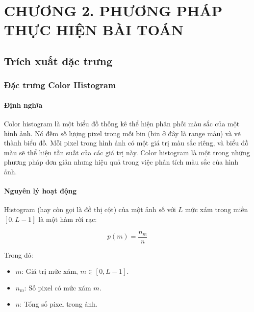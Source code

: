 \documentclass[a4paper,12pt]{article}
\begin{document}
\newpage
\section*{\centering CHƯƠNG 2. PHƯƠNG PHÁP THỰC HIỆN BÀI TOÁN}
\vspace{1cm}
\setcounter{section}{2}
\setcounter{subsection}{0}
\subsection{Trích xuất đặc trưng}

\subsubsection{Đặc trưng Color Histogram}

\paragraph{Định nghĩa}
\hspace{5mm}Color histogram là một biểu đồ thống kê thể hiện phân phối màu sắc của một hình ảnh. Nó đếm số lượng pixel trong mỗi bin (bin ở đây là range màu) và vẽ thành biểu đồ. Mỗi pixel trong hình ảnh có một giá trị màu sắc riêng, và biểu đồ màu sẽ thể hiện tần suất của các giá trị này. Color histogram là một trong những phương pháp đơn giản nhưng hiệu quả trong việc phân tích màu sắc của hình ảnh.

\paragraph{Nguyên lý hoạt động}
\hspace{5mm}Histogram (hay còn gọi là đồ thị cột) của một ảnh số với \(L\) mức xám trong miền \([0, L-1]\) \cite{imageprocessing2019digital} là một hàm rời rạc:

\[
p(m) = \frac{n_m}{n}
\]

Trong đó:
\begin{itemize}
    \item \(m\): Giá trị mức xám, \(m \in [0, L-1]\).
    \item \(n_m\): Số pixel có mức xám \(m\).
    \item \(n\): Tổng số pixel trong ảnh.
\end{itemize}
\end{document}
